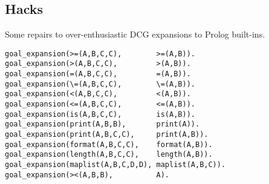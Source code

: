 \subsection{ Hacks
}
Some repairs to over-enthusiastic
DCG expansions to Prolog built-ins.
\begin{Verbatim}
goal_expansion(>=(A,B,C,C),        >=(A,B)).
goal_expansion(>(A,B,C,C),         >(A,B)).
goal_expansion(=(A,B,C,C),         =(A,B)).
goal_expansion(\=(A,B,C,C),        \=(A,B)).
goal_expansion(<(A,B,C,C),         <(A,B)).
goal_expansion(<=(A,B,C,C),        <=(A,B)).
goal_expansion(is(A,B,C,C),        is(A,B)).
goal_expansion(print(A,B,B),       print(A)).
goal_expansion(print(A,B,C,C),     print(A,B)).
goal_expansion(format(A,B,C,C),    format(A,B)).
goal_expansion(length(A,B,C,C),    length(A,B)).
goal_expansion(maplist(A,B,C,D,D), maplist(A,B,C)).
goal_expansion(><(A,B,B),          A).
\end{Verbatim}
